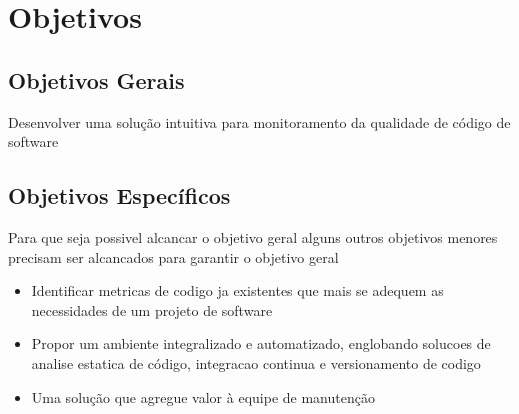 	

	\section{Objetivos}

	\subsection{Objetivos Gerais} %
	\label{sub:objetivos_gerais}
	
		Desenvolver uma solução intuitiva para monitoramento da qualidade de código de software


	\subsection{Objetivos Específicos} %
	\label{sub:objetivos_específicos}

	Para que seja possivel alcancar o objetivo geral alguns outros objetivos menores precisam ser alcancados para garantir  o objetivo geral 
		 
	\begin{itemize}
		\item Identificar metricas de codigo ja existentes que mais se adequem as necessidades de um projeto de software 
		\item Propor um ambiente integralizado e automatizado, englobando solucoes de analise estatica de código, integracao continua e versionamento de codigo
		\item Uma solução que agregue valor à equipe de manutenção 
	\end{itemize}
	

